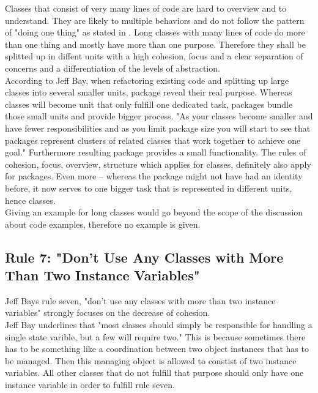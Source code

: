 Classes that consist of very many lines of code are hard to overview and to understand. They are likely to multiple behaviors and do not follow the pattern of "doing one thing" as stated in \cite{cc}. Long classes with many lines of code do more than one thing and mostly have more than one purpose. Therefore they shall be splitted up in diffent units with a high cohesion, focus and a clear separation of concerns and a differentiation of the levels of abstraction. 
\\

According to Jeff Bay, when refactoring existing code and splitting up large classes into several smaller units, package reveal their real purpose. Whereas classes will become unit that only fulfill one dedicated task, packages bundle those small units and provide bigger process. "As your classes become smaller and have fewer responsibilities and as you limit package size you will start to see that packages represent clusters of related classes that work together to achieve one goal." \cite{oc2008} Furthermore resulting package provides a small functionality. The rules of cohesion, focus, overview, structure which applies for classes, definitely also apply for packages. Even more -- whereas the package might not have had an identity before, it now serves to one bigger task that is represented in different units, hence classes. 
\\

Giving an example for long classes would go beyond the scope of the discussion about code examples, therefore no example is given.


\subsection*{Rule 7: "Don’t Use Any Classes with More Than Two Instance Variables"}
Jeff Bays rule seven, "don't use any classes with more than two instance variables" strongly focuses on the decrease of cohesion.
\\

Jeff Bay underlines that "most classes should simply be responsible for handling a single state varible, but a few will require two." \cite{oc2008} This is because sometimes there has to be something like a coordination between two object instances that has to be managed. Then this managing object is allowed to constist of two instance variables. All other classes that do not fulfill that purpose should only have one instance variable in order to fulfill rule seven.
\\

